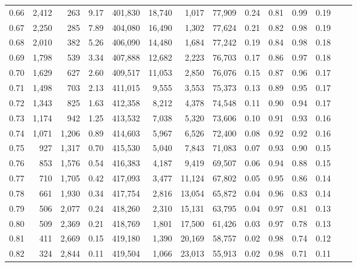 \begin{tabular}{rrrrrrrrrrrrrr}
0.66 &  2,412 &    263 &     9.17 &  401,830 &   18,740 &   1,017 &  77,909 &  0.24 &  0.81 &  0.99 &      0.19 \\
0.67 &  2,250 &    285 &     7.89 &  404,080 &   16,490 &   1,302 &  77,624 &  0.21 &  0.82 &  0.98 &      0.19 \\
0.68 &  2,010 &    382 &     5.26 &  406,090 &   14,480 &   1,684 &  77,242 &  0.19 &  0.84 &  0.98 &      0.18 \\
0.69 &  1,798 &    539 &     3.34 &  407,888 &   12,682 &   2,223 &  76,703 &  0.17 &  0.86 &  0.97 &      0.18 \\
0.70 &  1,629 &    627 &     2.60 &  409,517 &   11,053 &   2,850 &  76,076 &  0.15 &  0.87 &  0.96 &      0.17 \\
0.71 &  1,498 &    703 &     2.13 &  411,015 &    9,555 &   3,553 &  75,373 &  0.13 &  0.89 &  0.95 &      0.17 \\
0.72 &  1,343 &    825 &     1.63 &  412,358 &    8,212 &   4,378 &  74,548 &  0.11 &  0.90 &  0.94 &      0.17 \\
0.73 &  1,174 &    942 &     1.25 &  413,532 &    7,038 &   5,320 &  73,606 &  0.10 &  0.91 &  0.93 &      0.16 \\
0.74 &  1,071 &  1,206 &     0.89 &  414,603 &    5,967 &   6,526 &  72,400 &  0.08 &  0.92 &  0.92 &      0.16 \\
0.75 &    927 &  1,317 &     0.70 &  415,530 &    5,040 &   7,843 &  71,083 &  0.07 &  0.93 &  0.90 &      0.15 \\
0.76 &    853 &  1,576 &     0.54 &  416,383 &    4,187 &   9,419 &  69,507 &  0.06 &  0.94 &  0.88 &      0.15 \\
0.77 &    710 &  1,705 &     0.42 &  417,093 &    3,477 &  11,124 &  67,802 &  0.05 &  0.95 &  0.86 &      0.14 \\
0.78 &    661 &  1,930 &     0.34 &  417,754 &    2,816 &  13,054 &  65,872 &  0.04 &  0.96 &  0.83 &      0.14 \\
0.79 &    506 &  2,077 &     0.24 &  418,260 &    2,310 &  15,131 &  63,795 &  0.04 &  0.97 &  0.81 &      0.13 \\
0.80 &    509 &  2,369 &     0.21 &  418,769 &    1,801 &  17,500 &  61,426 &  0.03 &  0.97 &  0.78 &      0.13 \\
0.81 &    411 &  2,669 &     0.15 &  419,180 &    1,390 &  20,169 &  58,757 &  0.02 &  0.98 &  0.74 &      0.12 \\
0.82 &    324 &  2,844 &     0.11 &  419,504 &    1,066 &  23,013 &  55,913 &  0.02 &  0.98 &  0.71 &      0.11 \\

\end{tabular}
